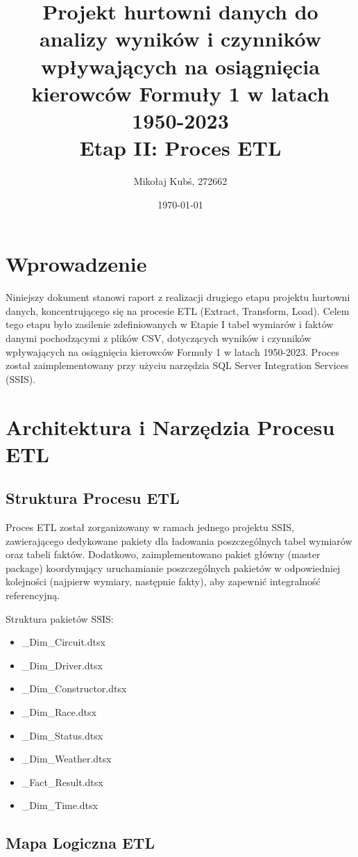 \documentclass[a4paper,12pt]{article}
\title{Projekt hurtowni danych do analizy wyników i czynników wpływających na osiągnięcia kierowców Formuły 1 w latach 1950-2023 \\ \vspace{0.5em} \large Etap II: Proces ETL}
\author{Mikołaj Kubś, 272662}
\date{\today}
\begin{document}
\maketitle
\tableofcontents
\newpage

\section{Wprowadzenie}
Niniejszy dokument stanowi raport z realizacji drugiego etapu projektu hurtowni danych, koncentrującego się na procesie ETL (Extract, Transform, Load). Celem tego etapu było zasilenie zdefiniowanych w Etapie I tabel wymiarów i faktów danymi pochodzącymi z plików CSV, dotyczących wyników i czynników wpływających na osiągnięcia kierowców Formuły 1 w latach 1950-2023. Proces został zaimplementowany przy użyciu narzędzia SQL Server Integration Services (SSIS).

\section{Architektura i Narzędzia Procesu ETL}

\subsection{Struktura Procesu ETL}
Proces ETL został zorganizowany w ramach jednego projektu SSIS, zawierającego dedykowane pakiety dla ładowania poszczególnych tabel wymiarów oraz tabeli faktów. Dodatkowo, zaimplementowano pakiet główny (master
package) koordynujący uruchamianie poszczególnych pakietów w odpowiedniej kolejności (najpierw wymiary, następnie fakty), aby zapewnić integralność referencyjną.

Struktura pakietów SSIS:
\begin{itemize}
  \item \_Dim\_Circuit.dtsx
  \item \_Dim\_Driver.dtsx
  \item \_Dim\_Constructor.dtsx
  \item \_Dim\_Race.dtsx
  \item \_Dim\_Status.dtsx
  \item \_Dim\_Weather.dtsx
  \item \_Fact\_Result.dtsx
  \item \_Dim\_Time.dtsx
\end{itemize}

\subsection{Mapa Logiczna ETL}
\end{document}
